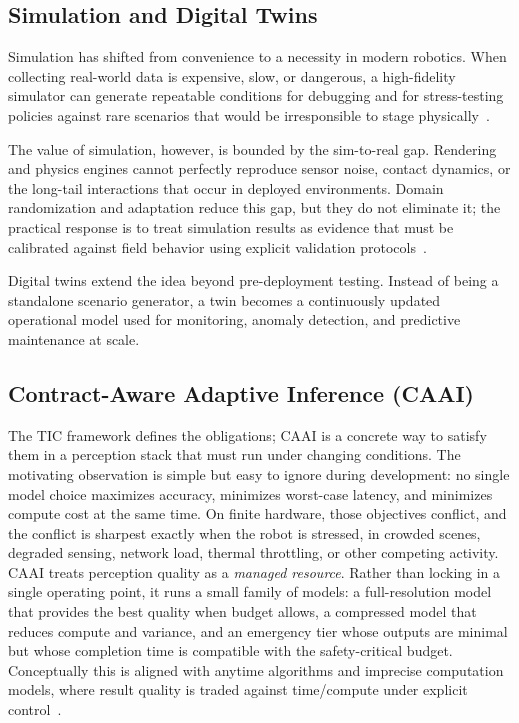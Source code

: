 \documentclass[smallextended]{svjour3}
\begin{document}
\subsection{Simulation and Digital Twins}

Simulation has shifted from convenience to a necessity in modern robotics. When collecting real-world data is expensive, slow, or dangerous, a high-fidelity simulator can generate repeatable conditions for debugging and for stress-testing policies
against rare scenarios that would be irresponsible to stage physically~\cite{shah2018airsim}.

The value of simulation, however, is bounded by the sim-to-real gap. Rendering and physics engines cannot perfectly reproduce sensor noise, contact dynamics, or the long-tail interactions that occur in deployed environments. Domain randomization and
adaptation reduce this gap, but they do not eliminate it; the practical response is to treat simulation results as evidence that must be calibrated against field behavior using explicit validation protocols~\cite{tobin2017domain,zhao2020sim2real}.

Digital twins extend the idea beyond pre-deployment testing. Instead of being a standalone scenario generator, a twin becomes a continuously updated operational model used for monitoring, anomaly detection, and predictive maintenance at scale.

\subsection{Contract-Aware Adaptive Inference (CAAI)}
\label{sec:caai}

The TIC framework defines the obligations; CAAI is a concrete way to satisfy them in a perception stack that must run under changing conditions. The motivating observation is simple but easy to ignore during development: no single model choice maximizes accuracy, minimizes worst-case latency, and minimizes compute cost at the same time. On finite hardware, those objectives conflict, and the conflict is sharpest exactly
when the robot is stressed, in crowded scenes, degraded sensing, network load, thermal throttling, or other competing activity.
CAAI treats perception quality as a \emph{managed resource}. Rather than locking in a single operating point, it runs a small family of models: a full-resolution model that provides the best quality when budget allows, a compressed model that reduces compute and variance, and an emergency tier whose outputs are minimal but whose completion time is compatible with the safety-critical budget. Conceptually this is aligned with anytime algorithms and imprecise computation models, where result quality is traded against time/compute under explicit control~\cite{deanboddy1988,zilberstein1996anytime,shihliu1995}.
\end{document}
